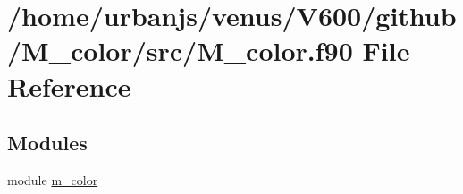 \hypertarget{M__color_8f90}{}\section{/home/urbanjs/venus/\+V600/github/\+M\+\_\+color/src/\+M\+\_\+color.f90 File Reference}
\label{M__color_8f90}
\subsection*{Modules}
\begin{DoxyCompactItemize}
\item 
module \mbox{\hyperlink{namespacem__color}{m\+\_\+color}}
\end{DoxyCompactItemize}
